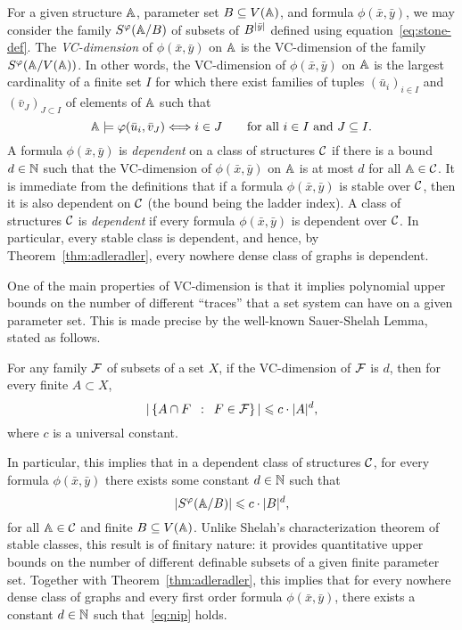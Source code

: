 For a given structure $\str A$, parameter set $B\subseteq V(\str A)$, and formula $\phi(\bar x,\bar y)$,
we may consider the family $S^\phi(\str A/B)$ of subsets of $B^{|\tup y|}$ defined using equation~\eqref{eq:stone-def}.
The \emph{VC-dimension} of $\phi(\bar x,\bar y)$ on $\str A$ is the VC-dimension of the family $S^\phi(\str A/V(\str A))$. 
In other words, the VC-dimension of $\phi(\bar x,\bar y)$
on $\str A$ is the largest cardinality of a finite
set $I$ for which there exist families of tuples $(\bar u_i)_{i\in I}$ and $(\bar v_J)_{J\subset I}$
of elements of $\str A$
such that  $$\strA\models\phi(\tup{u}_i,\tup{v}_J)\Longleftrightarrow i\in J\qquad \text {for all $i\in I$ and $J\subset I$.}$$
A formula $\phi(\bar x,\bar y)$ is \emph{dependent} on a class of structures $\cal C$
if there is a bound $d\in\N$ such that the VC-dimension of $\phi(\bar x,\bar y)$ on $\str A$ is at most $d$ for all $\str A\in\cal C$.
It is immediate from the definitions  that if a formula $\phi(\bar x,\bar y)$ is stable over $\cal C$, then it is also dependent on $\cal C$ (the bound being the ladder index). 
A class of structures  $\cal C$ is {\em{dependent}} if every formula $\phi(\bar x,\bar y)$ is dependent over $\cal C$. 
In particular, every stable class is dependent, and hence, by Theorem~\ref{thm:adleradler}, every nowhere dense class of graphs is dependent.

One of the main properties of VC-dimension is that it implies polynomial upper bounds on the number of different ``traces'' that a set system can have on a given parameter set.
This is made precise by the well-known Sauer-Shelah Lemma, stated as follows.
\begin{theorem}\label{thm:sauer-shelah}
  For any family $\FFF$ of subsets of a set $X$, if the VC-dimension of $\FFF$ is $d$,
  then for every finite $A\subset X$,
\[|\setof{A\cap F}{F\in {\cal F}}|\le c\cdot |A|^d, \] 
where $c$ is a universal constant.
\end{theorem}
In particular, this implies that 
in a dependent class of structures $\cal C$, 
for every formula $\phi(\bar x,\bar y)$
there exists some constant $d\in \N$
such that
\begin{equation}\label{eq:nip}
|S^\phi(\str A/B)|\le c\cdot |B|^d,	
\end{equation}
for all $\str A\in\cal C$ and finite $B\subset V(\str A)$.
Unlike Shelah's characterization theorem of stable classes, this result 
is of finitary nature: it provides quantitative upper bounds on the number of different definable subsets of a given finite parameter set. 
Together with Theorem~\ref{thm:adleradler}, this implies that for every nowhere dense class of graphs %
and every first order formula $\phi(\bar x,\bar y)$,
there exists a constant \mbox{$d\in\N$} such that~\eqref{eq:nip} holds. 

